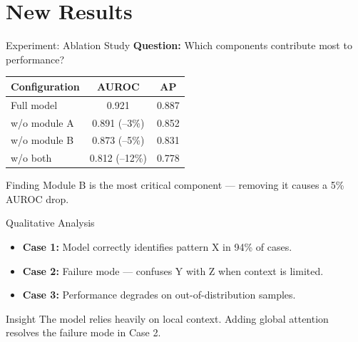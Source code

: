 \documentclass[aspectratio=169]{beamer}
\begin{document}
\section{New Results}

\begin{frame}{Experiment: Ablation Study}
  \textbf{Question:} Which components contribute most to performance?

  \begin{table}
    \centering
    \begin{tabular}{lcc}
      \toprule
      \textbf{Configuration} & \textbf{AUROC} & \textbf{AP} \\
      \midrule
      Full model             & 0.921          & 0.887       \\
      w/o module A           & 0.891 (--3\%)  & 0.852       \\
      w/o module B           & 0.873 (--5\%)  & 0.831       \\
      w/o both               & 0.812 (--12\%) & 0.778       \\
      \bottomrule
    \end{tabular}
  \end{table}

  \begin{alertblock}{Finding}
    Module B is the most critical component --- removing it causes a 5\% AUROC drop.
  \end{alertblock}
\end{frame}

\begin{frame}{Qualitative Analysis}
  \begin{itemize}
    \item \textbf{Case 1:} Model correctly identifies pattern X in 94\% of cases.
    \item \textbf{Case 2:} Failure mode --- confuses Y with Z when context is limited.
    \item \textbf{Case 3:} Performance degrades on out-of-distribution samples.
  \end{itemize}

  \vspace{0.5em}
  \begin{block}{Insight}
    The model relies heavily on local context. Adding global attention resolves
    the failure mode in Case 2.
  \end{block}
\end{frame}
\end{document}
